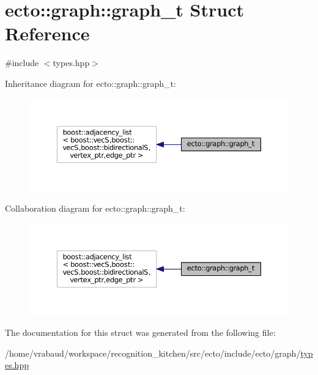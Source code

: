 \hypertarget{structecto_1_1graph_1_1graph__t}{}\section{ecto\+:\+:graph\+:\+:graph\+\_\+t Struct Reference}
\label{structecto_1_1graph_1_1graph__t}


{\ttfamily \#include $<$types.\+hpp$>$}



Inheritance diagram for ecto\+:\+:graph\+:\+:graph\+\_\+t\+:\nopagebreak
\begin{figure}[H]
\begin{center}
\leavevmode
\includegraphics[width=350pt]{structecto_1_1graph_1_1graph__t__inherit__graph}
\end{center}
\end{figure}


Collaboration diagram for ecto\+:\+:graph\+:\+:graph\+\_\+t\+:\nopagebreak
\begin{figure}[H]
\begin{center}
\leavevmode
\includegraphics[width=350pt]{structecto_1_1graph_1_1graph__t__coll__graph}
\end{center}
\end{figure}


The documentation for this struct was generated from the following file\+:\begin{DoxyCompactItemize}
\item 
/home/vrabaud/workspace/recognition\+\_\+kitchen/src/ecto/include/ecto/graph/\hyperlink{types_8hpp}{types.\+hpp}\end{DoxyCompactItemize}
